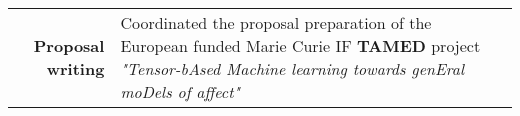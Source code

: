 \documentclass[a4paper,10pt]{article}
\begin{document}
\begin{longtable}{r p{11cm}}


\textbf{Proposal writing}
&Coordinated the proposal preparation of the European funded Marie Curie IF \textbf{TAMED} project \small{\textit{"Tensor-bAsed Machine learning towards genEral moDels of affect"}} \vspace{0.05in}\\


\end{longtable}
\end{document}
